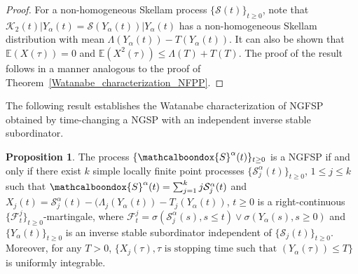 \documentclass[11pt,oneside,reqno]{amsart}
\theoremstyle{definition}
\newtheorem{proposition}{Proposition}[section]
\theoremstyle{remarkstyle}
\begin{document}
\begin{proof}
For a non-homogeneous Skellam process $\{\mathcal{S}(t)\}_{t\ge 0}$, note that $\mathcal{K}_2(t)\big|Y_\alpha(t)=\mathcal{S}\left(Y_\alpha(t)\right)\big|Y_\alpha(t)$ has a non-homogeneous Skellam distribution with mean $\Lambda(Y_\alpha(t)) - T(Y_\alpha(t))$. It can also be shown that $\mathbb{E}(X(\tau))=0$ and $\mathbb{E}\left(X^2(\tau)\right)\le \Lambda(T) + T(T)$. The proof of the result follows in a manner analogous to the proof of Theorem~\ref{Watanabe_characterization_NFPP}.    
\end{proof}

The following result establishes the Watanabe characterization of NGFSP obtained by time-changing a NGSP with an independent inverse stable subordinator.
\begin{proposition}\label{Watanabe_characterization_NGFSP-II}
The process $\{\mathcalboondox{S}^{\alpha}(t)\}_{t\ge 0}$ is a NGFSP if and only if there exist $k$ simple locally finite point processes $\{\mathcal{S}^{\alpha}_{j}(t)\}_{t\ge 0}$, $1\le j\le k$ such that $\mathcalboondox{S}^{\alpha}(t)=\sum_{j=1}^{k}j\mathcal{S}^{\alpha}_{j}(t)$ and $X_j(t)=\mathcal{S}^{\alpha}_{j}(t)-(\Lambda_j(Y_{\alpha}(t))-T_j(Y_{\alpha}(t))$, $t\ge 0$ is a right-continuous $\{\mathcal{F}_t^j\}_{t\ge 0}$-martingale, where $\mathcal{F}_t^j=\sigma\left(\mathcal{S}_j^{\alpha}(s),s\le t\right)\vee\sigma\left(Y_{\alpha}(s),s\ge 0\right)$ and $\{Y_\alpha(t)\}_{t\ge 0}$ is an inverse stable subordinator independent of $\{\mathcal{S}_j(t)\}_{t\ge 0}$. Moreover, for any $T>0$, $\{X_j(\tau),\tau\,\, \text{is stopping time such that}\,\,(Y_{\alpha}(\tau))\le T\}$ is uniformly integrable.
\end{proposition}
\end{document}
